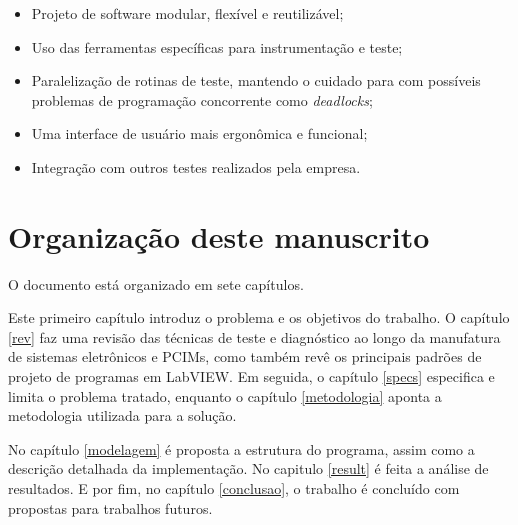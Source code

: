         \begin{itemize}
            \item Projeto de software modular, flexível e reutilizável;
            \item Uso das ferramentas específicas para instrumentação e teste;
            \item Paralelização de rotinas de teste, mantendo o cuidado para com possíveis problemas de programação concorrente como \textit{deadlocks};
            \item Uma interface de usuário mais ergonômica e funcional;
            \item Integração com outros testes realizados pela empresa.
        \end{itemize}
            

    \section{Organização deste manuscrito}
        
        O documento está organizado em sete capítulos.
        
        Este primeiro capítulo introduz o problema e os objetivos do trabalho.
        O capítulo \ref{rev} faz uma revisão das técnicas de teste e diagnóstico ao longo da manufatura de sistemas eletrônicos e PCIMs, como também revê os principais padrões de projeto de programas em LabVIEW. Em seguida, o capítulo \ref{specs} especifica e limita o problema tratado, enquanto o capítulo \ref{metodologia} aponta a metodologia utilizada para a solução.       
       
        No capítulo \ref{modelagem} é proposta a estrutura do programa, assim como a descrição detalhada da implementação. No capitulo \ref{result} é feita a análise de resultados. E por fim, no capítulo \ref{conclusao}, o trabalho é concluído com propostas para trabalhos futuros.
        